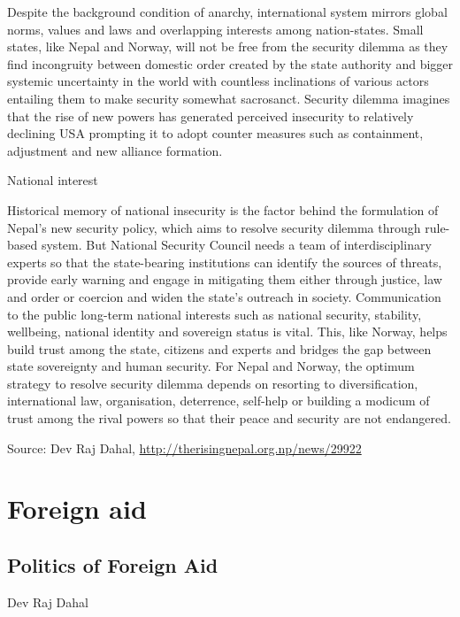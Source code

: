 \documentclass[
  openany]{book}
\begin{document}
Despite the background condition of anarchy, international system mirrors global norms, values and laws and overlapping interests among nation-states. Small states, like Nepal and Norway, will not be free from the security dilemma as they find incongruity between domestic order created by the state authority and bigger systemic uncertainty in the world with countless inclinations of various actors entailing them to make security somewhat sacrosanct. Security dilemma imagines that the rise of new powers has generated perceived insecurity to relatively declining USA prompting it to adopt counter measures such as containment, adjustment and new alliance formation.

National interest

Historical memory of national insecurity is the factor behind the formulation of Nepal's new security policy, which aims to resolve security dilemma through rule-based system. But National Security Council needs a team of interdisciplinary experts so that the state-bearing institutions can identify the sources of threats, provide early warning and engage in mitigating them either through justice, law and order or coercion and widen the state's outreach in society. Communication to the public long-term national interests such as national security, stability, wellbeing, national identity and sovereign status is vital. This, like Norway, helps build trust among the state, citizens and experts and bridges the gap between state sovereignty and human security. For Nepal and Norway, the optimum strategy to resolve security dilemma depends on resorting to diversification, international law, organisation, deterrence, self-help or building a modicum of trust among the rival powers so that their peace and security are not endangered.

Source: Dev Raj Dahal, \url{http://therisingnepal.org.np/news/29922}

\hypertarget{foreign-aid}{%
\section{Foreign aid}\label{foreign-aid}}

\hypertarget{politics-of-foreign-aid}{%
\subsection{Politics of Foreign Aid}\label{politics-of-foreign-aid}}

Dev Raj Dahal
\end{document}

